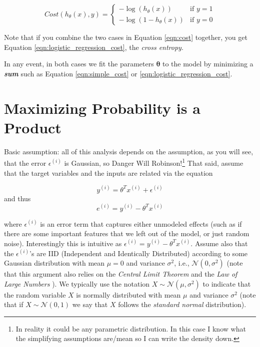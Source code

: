 \documentclass[11pt, oneside]{article}   	%
\begin{document}
\begin{equation}
\label{eqn:cost}
Cost(h_\theta(x), y) =
\begin{cases}
 -\log (h_\theta(x))    & \textrm{if }  y=1\\
 -\log (1-h_\theta(x)) & \textrm{if } y=0
 \end{cases}
\end{equation}

\bigskip
\noindent
Note that if you combine the two cases in Equation \ref{eqn:cost} together, you get Equation \ref{eqn:logistic_regression_cost}, the \emph{cross entropy}.

\bigskip
\noindent
In any event, in both cases we fit the parameters $\boldsymbol{\theta}$ to the model by minimizing a \textit{\bf{sum}} such as  Equation \ref{eqn:simple_cost} or \ref{eqn:logistic_regression_cost}.

\section{Maximizing Probability is a Product}

Basic assumption: all of this analysis depends on the assumption, as you will see, that the error $\epsilon^{(i)}$ is Gaussian, so Danger Will Robinson!\footnote{In reality it could be any parametric distribution. In this case I know what the simplifying assumptions are/mean so I can write the density down.} That said, assume that the target variables and the inputs are related via the equation

\begin{equation}
y^{(i)} = \theta^{T}x^{(i)} + \epsilon^{(i)}
\end{equation}
and thus
\begin{equation}
e^{(i)} = y^{(i)} - \theta^{T}x^{(i)}
\end{equation}


\bigskip
\noindent
where $\epsilon^{(i)}$ is an error term that captures either unmodeled effects (such as
if there are some important features that we left out of the model, or just random noise). Interestingly this is intuitive as $\epsilon^{(i)} = y^{(i)} - \theta^{T} x^{(i)}$.  Assume also 
that the $\epsilon^{(i)}$'s are IID (Independent and Identically Distributed) according to some Gaussian distribution with mean $\mu = 0$ and variance $\sigma^2$, i.e., $\mathcal{N}(0,\sigma^2)$ (note that this argument also relies on the \emph{Central Limit Theorem} and the \emph{Law of Large Numbers} \cite{LLN}). We typically use the notation $X \sim \mathcal{N}(\mu,\sigma^2)$ to indicate that the random variable $X$ is normally distributed with mean $\mu$ and variance  $\sigma^2$ (note that if $X \sim \mathcal{N}(0,1)$ we say that $X$ follows the \emph{standard normal} distribution).  
\end{document}
